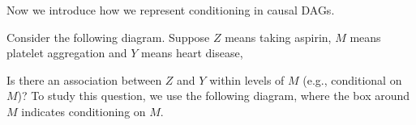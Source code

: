 
Now we introduce how we represent conditioning in causal DAGs. 

\begin{example}
    Consider the following diagram. Suppose $Z$ means taking aspirin, $M$ means platelet aggregation and $Y$ means heart disease, 
\begin{center}
\end{center}
Is there an association between $Z$ and $Y$ within levels of $M$ (e.g., conditional on $M$)? To study this question, we use the following diagram, where the box around $M$ indicates conditioning on $M$.

\begin{center}
\end{center}

\end{example}


